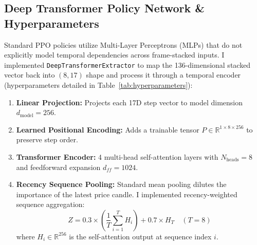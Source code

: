 \documentclass[11pt,a4paper]{article}
\begin{document}
\subsection{Deep Transformer Policy Network \& Hyperparameters}
Standard PPO policies utilize Multi-Layer Perceptrons (MLPs) that do not explicitly model temporal dependencies across frame-stacked inputs. I implemented \texttt{DeepTransformerExtractor} to map the 136-dimensional stacked vector back into $(8, 17)$ shape and process it through a temporal encoder (hyperparameters detailed in Table~\ref{tab:hyperparameters}):
\begin{enumerate}[leftmargin=2em]
    \item \textbf{Linear Projection:} Projects each 17D step vector to model dimension $d_{\text{model}} = 256$.
    \item \textbf{Learned Positional Encoding:} Adds a trainable tensor $P \in \mathbb{R}^{1 \times 8 \times 256}$ to preserve step order.
    \item \textbf{Transformer Encoder:} 4 multi-head self-attention layers with $N_{\text{heads}} = 8$ and feedforward expansion $d_{ff} = 1024$.
    \item \textbf{Recency Sequence Pooling:} Standard mean pooling dilutes the importance of the latest price candle. I implemented recency-weighted sequence aggregation:
    \begin{equation}
    Z = 0.3 \times \left( \frac{1}{T} \sum_{i=1}^T H_i \right) + 0.7 \times H_T \quad (T = 8)
    \end{equation}
    where $H_i \in \mathbb{R}^{256}$ is the self-attention output at sequence index $i$.
\end{enumerate}
\end{document}
